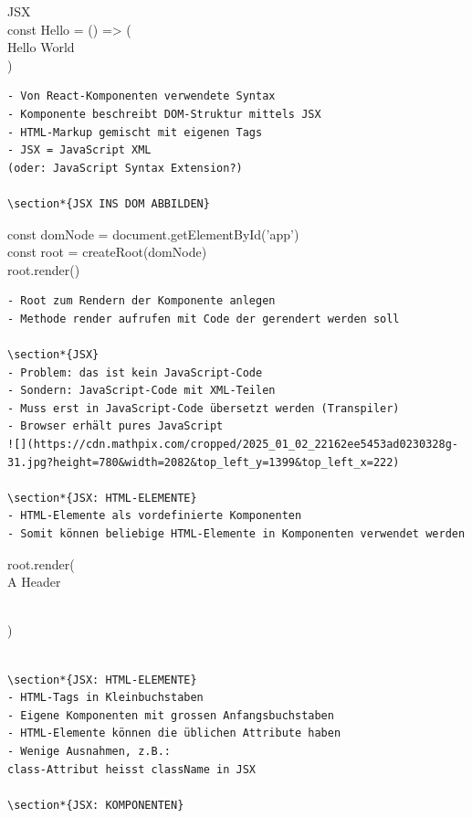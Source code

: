 JSX\\
const Hello = () => (\\
Hello World\\
)

\begin{verbatim}
- Von React-Komponenten verwendete Syntax
- Komponente beschreibt DOM-Struktur mittels JSX
- HTML-Markup gemischt mit eigenen Tags
- JSX = JavaScript XML
(oder: JavaScript Syntax Extension?)

\section*{JSX INS DOM ABBILDEN}
\end{verbatim}

const domNode = document.getElementById('app')\\
const root = createRoot(domNode)\\
root.render()

\begin{verbatim}
- Root zum Rendern der Komponente anlegen
- Methode render aufrufen mit Code der gerendert werden soll

\section*{JSX}
- Problem: das ist kein JavaScript-Code
- Sondern: JavaScript-Code mit XML-Teilen
- Muss erst in JavaScript-Code übersetzt werden (Transpiler)
- Browser erhält pures JavaScript
![](https://cdn.mathpix.com/cropped/2025_01_02_22162ee5453ad0230328g-31.jpg?height=780&width=2082&top_left_y=1399&top_left_x=222)

\section*{JSX: HTML-ELEMENTE}
- HTML-Elemente als vordefinierte Komponenten
- Somit können beliebige HTML-Elemente in Komponenten verwendet werden
\end{verbatim}

root.render(\\


A Header

\\
)

\begin{verbatim}

\section*{JSX: HTML-ELEMENTE}
- HTML-Tags in Kleinbuchstaben
- Eigene Komponenten mit grossen Anfangsbuchstaben
- HTML-Elemente können die üblichen Attribute haben
- Wenige Ausnahmen, z.B.:
class-Attribut heisst className in JSX

\section*{JSX: KOMPONENTEN}
\end{verbatim}

